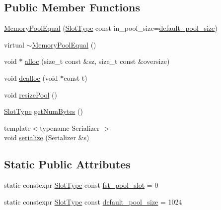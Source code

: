 \subsection*{Public Member Functions}
\begin{DoxyCompactItemize}
\item 
\hyperlink{structvt_1_1pool_1_1_memory_pool_equal_a588ccd66ce55b16d85ee47a739ec7cdd}{Memory\+Pool\+Equal} (\hyperlink{structvt_1_1pool_1_1_memory_pool_equal_a101fdcb943d0cb0863cf17655e0b4e1c}{Slot\+Type} const in\+\_\+pool\+\_\+size=\hyperlink{structvt_1_1pool_1_1_memory_pool_equal_a67dae02a7795b182a7302b9eb34924e7}{default\+\_\+pool\+\_\+size})
\item 
virtual \hyperlink{structvt_1_1pool_1_1_memory_pool_equal_a3639b62858bef876bf6f8a51cfdb7212}{$\sim$\+Memory\+Pool\+Equal} ()
\item 
void $\ast$ \hyperlink{structvt_1_1pool_1_1_memory_pool_equal_a070cb7e7f56cde226fe95a71832d7deb}{alloc} (size\+\_\+t const \&sz, size\+\_\+t const \&oversize)
\item 
void \hyperlink{structvt_1_1pool_1_1_memory_pool_equal_af02c22884cf082406c7f5dd00d9b77c8}{dealloc} (void $\ast$const t)
\item 
void \hyperlink{structvt_1_1pool_1_1_memory_pool_equal_acb03d02014eaebd24522525b059d4fb4}{resize\+Pool} ()
\item 
\hyperlink{structvt_1_1pool_1_1_memory_pool_equal_a101fdcb943d0cb0863cf17655e0b4e1c}{Slot\+Type} \hyperlink{structvt_1_1pool_1_1_memory_pool_equal_a5a760235c3429f60ba394d166ee0e26b}{get\+Num\+Bytes} ()
\item 
{\footnotesize template$<$typename Serializer $>$ }\\void \hyperlink{structvt_1_1pool_1_1_memory_pool_equal_a3235659dbd03bf8c1df2f39d77f33b56}{serialize} (Serializer \&s)
\end{DoxyCompactItemize}
\subsection*{Static Public Attributes}
\begin{DoxyCompactItemize}
\item 
static constexpr \hyperlink{structvt_1_1pool_1_1_memory_pool_equal_a101fdcb943d0cb0863cf17655e0b4e1c}{Slot\+Type} const \hyperlink{structvt_1_1pool_1_1_memory_pool_equal_ae0435baf515fefccc015b600357bc6bb}{fst\+\_\+pool\+\_\+slot} = 0
\item 
static constexpr \hyperlink{structvt_1_1pool_1_1_memory_pool_equal_a101fdcb943d0cb0863cf17655e0b4e1c}{Slot\+Type} const \hyperlink{structvt_1_1pool_1_1_memory_pool_equal_a67dae02a7795b182a7302b9eb34924e7}{default\+\_\+pool\+\_\+size} = 1024
\end{DoxyCompactItemize}
